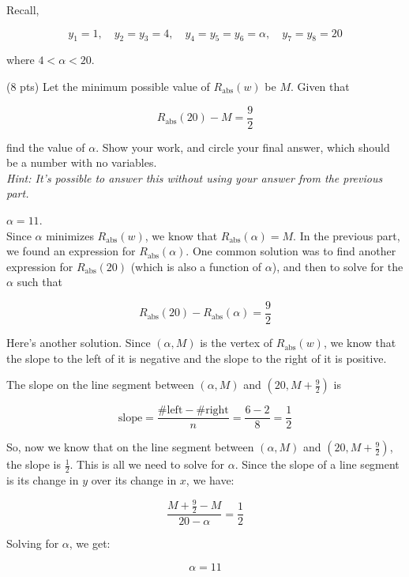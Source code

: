 \documentclass[11pt]{article}
\begin{document}
\begin{prob}
\begin{subprob}
\begin{solution}
\end{solution}

\end{subprob}

\newpage

Recall, 

$$y_1 = 1,\quad y_2 = y_3 = 4, \quad y_4 = y_5 = y_6 = \alpha,\quad y_7 = y_8 = 20$$

where $4 < \alpha < 20$.

\begin{subprob}(8 pts) Let the minimum possible value of $R_\text{abs}(w)$ be $M$. Given that

$$R_\text{abs}(20) - M = \frac{9}{2}$$

find the value of $\alpha$. Show your work, and $\boxed{\text{circle}}$ your final answer, which should be a number with no variables. \\

\textit{Hint: It's possible to answer this without using your answer from the previous part.}

\begin{solution}
$\alpha = 11$. \\

Since $\alpha$ minimizes $R_\text{abs}(w)$, we know that $R_\text{abs}(\alpha) = M$. In the previous part, we found an expression for $R_\text{abs}(\alpha)$. One common solution was to find another expression for $R_\text{abs}(20)$ (which is also a function of $\alpha$), and then to solve for the $\alpha$ such that

$$R_\text{abs}(20) - R_\text{abs}(\alpha) = \frac{9}{2}$$

Here's another solution. Since $(\alpha, M)$ is the vertex of $R_\text{abs}(w)$, we know that the slope to the left of it is negative and the slope to the right of it is positive.

The slope on the line segment between $(\alpha, M)$ and $(20, M + \frac{9}{2})$ is

$$\text{slope} = \frac{\# \text{left} - \# \text{right}}{n} = \frac{6 - 2}{8} = \frac{1}{2}$$

So, now we know that on the line segment between $(\alpha, M)$ and $(20, M + \frac{9}{2})$, the slope is $\frac{1}{2}$. This is all we need to solve for $\alpha$. Since the slope of a line segment is its change in $y$ over its change in $x$, we have:

$$\frac{M + \frac{9}{2} - M}{20 - \alpha} = \frac{1}{2}$$

Solving for $\alpha$, we get:

$$\alpha = 11$$

\end{solution}

\emptybox{15.5cm}

\end{subprob}

\end{prob}
\end{document}
